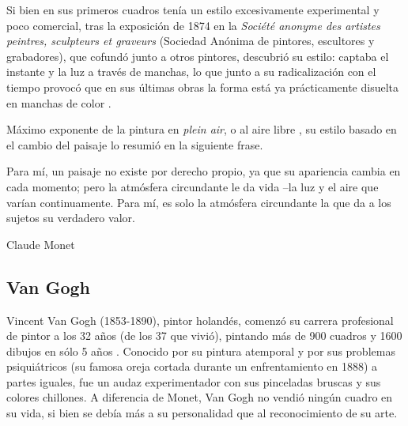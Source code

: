 \documentclass[../main.tex]{subfiles}
\begin{document}
Si bien en sus primeros cuadros tenía un estilo excesivamente experimental y poco comercial, tras la exposición de 1874 en la \textit{Société anonyme des artistes peintres, sculpteurs et graveurs} (Sociedad Anónima de pintores, escultores y grabadores), que cofundó junto a otros pintores, descubrió su estilo: captaba el instante y la luz a través de manchas, lo que junto a su radicalización con el tiempo provocó que en sus últimas obras la forma está ya prácticamente disuelta en manchas de color \cite{CalvoSantos2016}.

Máximo exponente de la pintura en \textit{plein air}, o al aire libre \cite{Sienra2019}, su estilo basado en el cambio del paisaje lo resumió en la siguiente frase.

 \begin{center}
    \begin{minipage}{0.9\linewidth}
        \vspace{5pt}%
        {\small
            Para mí, un paisaje no existe por derecho propio, ya que su apariencia cambia en cada momento; pero la atmósfera circundante le da vida –la luz y el aire que varían continuamente. Para mí, es solo la atmósfera circundante la que da a los sujetos su verdadero valor.
        }
        \begin{flushright}
            Claude Monet \cite{Sienra2019}
        \end{flushright}
        \vspace{3pt}%
    \end{minipage}
\end{center}

\subsection{Van Gogh}

Vincent Van Gogh (1853-1890), pintor holandés, comenzó su carrera profesional de pintor a los 32 años (de los 37 que vivió), pintando más de 900 cuadros y 1600 dibujos en sólo 5 años \cite{CalvoSantos2016-2}. Conocido por su pintura atemporal y por sus problemas psiquiátricos (su famosa oreja cortada durante un enfrentamiento en 1888) a partes iguales, fue un audaz experimentador con sus pinceladas bruscas y sus colores chillones. A diferencia de Monet, Van Gogh no vendió ningún cuadro en su vida, si bien se debía más a su personalidad que al reconocimiento de su arte. 
\end{document}
